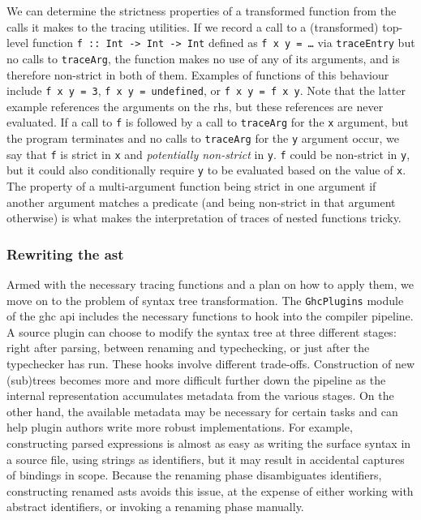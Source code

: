 \documentclass[thesis=B,english]{FITthesis}[2019/12/23]
\newcommand{\hsIdent}[1]{\texttt{#1}}
\newcommand{\hsCode}[1]{\texttt{#1}}
\begin{document}
We can determine the strictness properties of a transformed function from the
calls it makes to the tracing utilities. If we record a call to a (transformed)
top-level function \hsCode{f :: Int -> Int -> Int} defined as \hsCode{f x y =
\ldots} via \hsIdent{traceEntry} but no calls to \hsIdent{traceArg}, the
function makes no use of any of its arguments, and is therefore non-strict in
both of them. Examples of functions of this behaviour include \hsCode{f x y =
3}, \hsCode{f x y = undefined}, or \hsCode{f x y = f x y}. Note that the latter
example references the arguments on the \acrshort{rhs}, but these references are
never evaluated. If a call to \hsIdent{f} is followed by a call to
\hsIdent{traceArg} for the \hsIdent{x} argument, but the program terminates and
no calls to \hsIdent{traceArg} for the \hsIdent{y} argument occur, we say that
\hsIdent{f} is strict in \hsIdent{x} and \textit{potentially non-strict} in
\hsIdent{y}. \hsIdent{f} could be non-strict in \hsIdent{y}, but it could also
conditionally require \hsIdent{y} to be evaluated based on the value of
\hsIdent{x}. The property of a multi-argument function being strict in one
argument if another argument matches a predicate (and being non-strict in that
argument otherwise) is what makes the interpretation of traces of nested
functions tricky.

\subsubsection*{Rewriting the \acrshort{ast}}
Armed with the necessary tracing functions and a plan on how to apply them, we
move on to the problem of syntax tree transformation. The \texttt{GhcPlugins}
module\cite{hkg-ghcplugins} of the \acrshort{ghc} \acrshort{api} includes the
necessary functions to hook into the compiler pipeline. A source plugin can
choose to modify the syntax tree at three different stages: right after
parsing, between renaming and typechecking, or just after the typechecker has
run. These hooks involve different trade-offs. Construction of new (sub)trees
becomes more and more difficult further down the pipeline as the internal
representation accumulates metadata from the various stages. On the other hand,
the available metadata may be necessary for certain tasks and can help plugin
authors write more robust implementations. For example, constructing parsed
expressions is almost as easy as writing the surface syntax in a source file,
using strings as identifiers, but it may result in accidental captures of
bindings in scope. Because the renaming phase disambiguates identifiers,
constructing renamed \acrshort{ast}s avoids this issue, at the expense of
either working with abstract identifiers, or invoking a renaming phase
manually.
\end{document}
